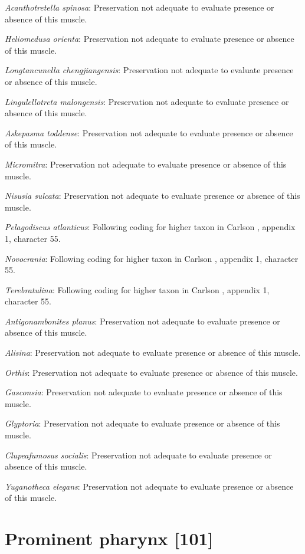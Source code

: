 \documentclass[]{book}
\theoremstyle{definition}
\theoremstyle{definition}
\theoremstyle{definition}
\theoremstyle{remark}
\begin{document}
\emph{Acanthotretella spinosa}: Preservation not adequate to evaluate
presence or absence of this muscle.

\emph{Heliomedusa orienta}: Preservation not adequate to evaluate
presence or absence of this muscle.

\emph{Longtancunella chengjiangensis}: Preservation not adequate to
evaluate presence or absence of this muscle.

\emph{Lingulellotreta malongensis}: Preservation not adequate to
evaluate presence or absence of this muscle.

\emph{Askepasma toddense}: Preservation not adequate to evaluate
presence or absence of this muscle.

\emph{Micromitra}: Preservation not adequate to evaluate presence or
absence of this muscle.

\emph{Nisusia sulcata}: Preservation not adequate to evaluate presence
or absence of this muscle.

\emph{Pelagodiscus atlanticus}: Following coding for higher taxon in
Carlson \citeyearpar{Carlson1995Phylogeneticrelationships}, appendix 1,
character 55.

\emph{Novocrania}: Following coding for higher taxon in Carlson
\citeyearpar{Carlson1995Phylogeneticrelationships}, appendix 1,
character 55.

\emph{Terebratulina}: Following coding for higher taxon in Carlson
\citeyearpar{Carlson1995Phylogeneticrelationships}, appendix 1,
character 55.

\emph{Antigonambonites planus}: Preservation not adequate to evaluate
presence or absence of this muscle.

\emph{Alisina}: Preservation not adequate to evaluate presence or
absence of this muscle.

\emph{Orthis}: Preservation not adequate to evaluate presence or absence
of this muscle.

\emph{Gasconsia}: Preservation not adequate to evaluate presence or
absence of this muscle.

\emph{Glyptoria}: Preservation not adequate to evaluate presence or
absence of this muscle.

\emph{Clupeafumosus socialis}: Preservation not adequate to evaluate
presence or absence of this muscle.

\emph{Yuganotheca elegans}: Preservation not adequate to evaluate
presence or absence of this muscle.

\hypertarget{prominent-pharynx-101}{%
\section{Prominent pharynx {[}101{]}}\label{prominent-pharynx-101}}
\end{document}
